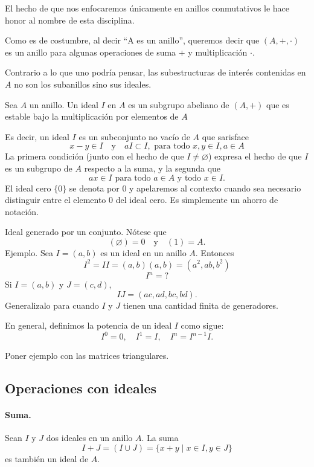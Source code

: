 \documentclass[b5paper,10pt]{book}
\begin{document}
El hecho de que nos enfocaremos únicamente
en anillos conmutativos le hace honor al nombre de 
esta disciplina.

Como es de costumbre, al decir 
``A es un anillo'', 
queremos decir que 
\((A,+,\cdot)\) es un anillo
para algunas operaciones de suma \(+\) y multiplicación \(\cdot\).

Contrario a lo que uno podría pensar,
las subestructuras de interés contenidas en \(A\)
no son los subanillos sino sus ideales.

\begin{defi}
Sea \(A\) un anillo.
Un ideal \(I\) en \(A\) es un subgrupo abeliano de \((A,+)\)
que es estable bajo la multiplicación por elementos de \(A\)
\end{defi}
Es decir, un ideal \(I\) es un subconjunto no vacío de \(A\) 
que sarisface
\[
x-y\in I\quad\text{y}\quad a I\subset I, \text{ para todo } x,y\in I, a \in A
\]
La primera condición (junto con el hecho de que \(I\neq \varnothing\))
expresa el hecho de que \(I\) es un subgrupo de \(A\) respecto a la suma,
y la segunda que 
\[
ax \in I \text{ para todo } a\in A \text{ y todo } x\in I.
\]
El ideal cero \(\{0\}\) se denota por \(0\)
y apelaremos al contexto cuando sea necesario
distinguir entre el elemento \(0\) del ideal cero.
Es simplemente un ahorro de notación.

Ideal generado por un conjunto.
Nótese que 
\[
(\varnothing) = 0\quad \text{y}\quad (1) = A.
\]
Ejemplo.
Sea \(I = (a,b)\) es un ideal en un anillo \(A\).
Entonces \[I^2 = II = (a,b)(a,b)= (a^2, ab, b^2)\]
\[
I^n = ? 
\]
Si \(I = (a,b)\) y \(J=(c,d)\),
\[
IJ = (ac,ad,bc,bd).
\]
Generalizalo para cuando \(I\) y \(J\) 
tienen una cantidad finita de generadores.

En general, definimos la potencia de un ideal \(I\) como sigue:
\[
I^0 = 0,\quad I^1 = I, \quad I^n = I^{n-1}I.
\]

Poner ejemplo con las matrices triangulares.

\subsection{Operaciones con ideales}

\paragraph{Suma.}%
Sean \(I\) y \(J\) dos ideales en un anillo \(A\).
La suma 
\[
I+J = \left(I\cup J\right)= \{x+y \mid x\in I, y\in J\}
\]
es también un ideal de \(A\).
\end{document}
